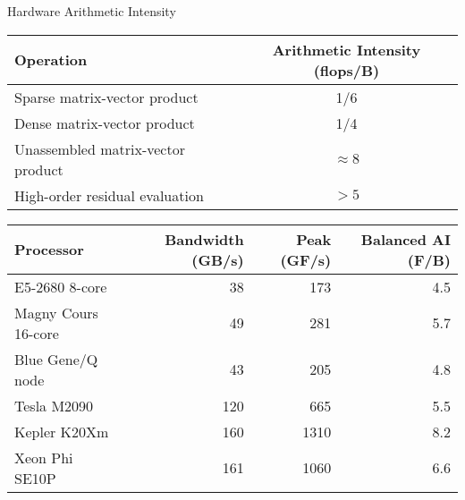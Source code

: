 \begin{frame}{Hardware Arithmetic Intensity}
  \begin{tabular}{lc}
    \toprule
    Operation                         & Arithmetic Intensity (flops/B) \\
    \midrule
    Sparse matrix-vector product      & 1/6                  \\
    Dense matrix-vector product       & 1/4                  \\
    Unassembled matrix-vector product & $\approx 8$          \\
    High-order residual evaluation    & $> 5$                \\
    \bottomrule
  \end{tabular}

  \bigskip

  \begin{tabular}{lrrr}
    \toprule
    Processor & Bandwidth (GB/s) & Peak (GF/s) & Balanced AI (F/B) \\
    \midrule
    E5-2680 8-core      & 38   & 173  & 4.5 \\ %
    Magny Cours 16-core & 49   & 281  & 5.7 \\
    Blue Gene/Q node    & 43   & 205  & 4.8 \\
    Tesla M2090         & 120  & 665  & 5.5 \\
    Kepler K20Xm        & 160 & 1310 & 8.2 \\ %
    Xeon Phi SE10P      & 161 & 1060 & 6.6 \\ %
    \bottomrule
  \end{tabular}
\end{frame}
